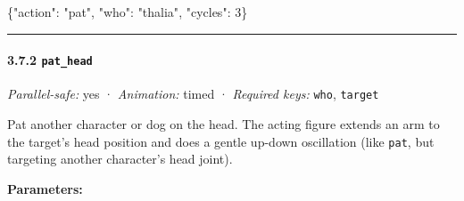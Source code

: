 \documentclass[
  11pt,
]{book}
\newenvironment{Shaded}{}{}
\newcommand{\DataTypeTok}[1]{\textcolor[rgb]{0.56,0.13,0.00}{#1}}
\newcommand{\DecValTok}[1]{\textcolor[rgb]{0.25,0.63,0.44}{#1}}
\newcommand{\FunctionTok}[1]{\textcolor[rgb]{0.02,0.16,0.49}{#1}}
\newcommand{\StringTok}[1]{\textcolor[rgb]{0.25,0.44,0.63}{#1}}
\begin{document}
\begin{Shaded}
\begin{Highlighting}[]
\FunctionTok{\{}\DataTypeTok{"action"}\FunctionTok{:} \StringTok{"pat"}\FunctionTok{,} \DataTypeTok{"who"}\FunctionTok{:} \StringTok{"thalia"}\FunctionTok{,} \DataTypeTok{"cycles"}\FunctionTok{:} \DecValTok{3}\FunctionTok{\}}
\end{Highlighting}
\end{Shaded}

\begin{center}\rule{0.5\linewidth}{0.5pt}\end{center}

\paragraph{\texorpdfstring{3.7.2
\texttt{pat\_head}}{3.7.2 pat\_head}}\label{pat_head}

\emph{Parallel-safe:} yes · \emph{Animation:} timed · \emph{Required
keys:} \texttt{who}, \texttt{target}

Pat another character or dog on the head. The acting figure extends an
arm to the target's head position and does a gentle up-down oscillation
(like \texttt{pat}, but targeting another character's head joint).

\textbf{Parameters:}
\end{document}
